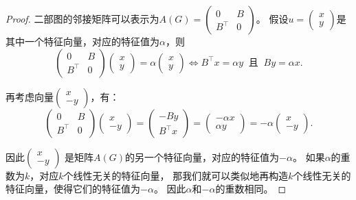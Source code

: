 \begin{proof}
    二部图的邻接矩阵可以表示为$A(G)=\left(\begin{array}{cc}
    0 & B \\
    B^\top & 0
    \end{array}\right)$。
    假设$u=\left(\begin{array}{cc}
    x \\
    y
    \end{array}\right)$是其中一个特征向量，对应的特征值为$\alpha$，则
    \[
    \left(\begin{array}{cc}
    0 & B \\
    B^\top & 0
    \end{array}\right)
    \left(\begin{array}{cc}
    x \\
    y
    \end{array}\right)
    =\alpha\left(\begin{array}{cc}
    x \\
    y
    \end{array}\right)
    \Longleftrightarrow
    B^\top x=\alpha y\ \text{ 且 }\ By=\alpha x.
    \]

    再考虑向量$\left(\begin{array}{cc}
    x \\
    -y
    \end{array}\right)$，有：
    \[
    \left(\begin{array}{cc}
    0 & B \\
    B^\top & 0
    \end{array}\right)
    \left(\begin{array}{cc}
    x \\
    -y
    \end{array}\right)
    =\left(\begin{array}{cc}
    -By \\
    B^\top x
    \end{array}\right)
    =\left(\begin{array}{cc}
    -\alpha x \\
    \alpha y
    \end{array}\right)
    =-\alpha\left(\begin{array}{cc}
    x \\
    -y
    \end{array}\right).
    \]

    因此$\left(\begin{array}{cc}
    x \\
    -y
    \end{array}\right)$
    是矩阵$A(G)$的另一个特征向量，对应的特征值为$-\alpha$。
    如果$\alpha$的重数为$k$，对应$k$个线性无关的特征向量，
    那我们就可以类似地再构造$k$个线性无关的特征向量，使得它们的特征值为$-\alpha$。
    因此$\alpha$和$-\alpha$的重数相同。
\end{proof}

